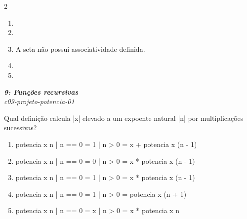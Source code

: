 \documentclass[a4paper,10pt,brazil]{article}
\begin{document}
\begin{multicols}{2}
\begin{enumerate}
  \item {}

  \item {}

  \item A seta não possui associatividade definida.

  \item {}

  \item {}


\end{enumerate}

\begin{flushright}
  \footnotesize
  \textit{\textbf{9: Funções recursivas}}\\
  \textit{c09-projeto-potencia-01}\\

\end{flushright}
Qual definição calcula \haskellinline|x| elevado a um expoente natural \haskellinline|n| por multiplicações sucessivas?

\begin{enumerate}
  \item \begin{haskellcode}
potencia x n
  | n == 0 = 1
  | n > 0  = x + potencia x (n - 1)
\end{haskellcode}

  \item \begin{haskellcode}
potencia x n
  | n == 0 = 0
  | n > 0  = x * potencia x (n - 1)
\end{haskellcode}

  \item \begin{haskellcode}
potencia x n
  | n == 0 = 1
  | n > 0  = x * potencia x (n - 1)
\end{haskellcode}

  \item \begin{haskellcode}
potencia x n
  | n == 0 = 1
  | n > 0  = potencia x (n + 1)
\end{haskellcode}

  \item \begin{haskellcode}
potencia x n
  | n == 0 = x
  | n > 0  = x * potencia x n
\end{haskellcode}



\end{enumerate}
\end{multicols}
\end{document}
